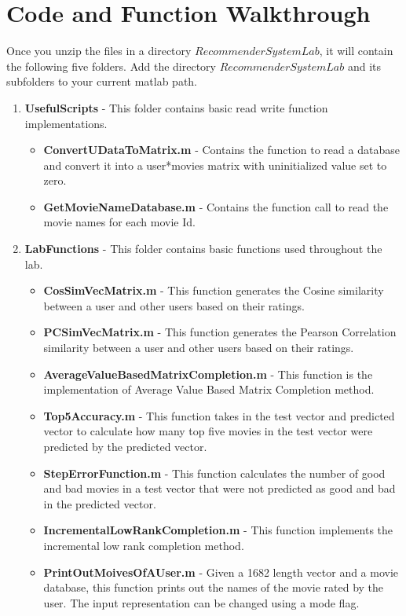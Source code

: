 \section{Code and Function Walkthrough}
Once you unzip the files in a directory $RecommenderSystemLab$, it will contain the following five folders. Add the directory $RecommenderSystemLab$ and its subfolders to your current matlab path.
\begin{enumerate}
\item \textbf{UsefulScripts} - This folder contains basic read write function implementations.
\begin{itemize}
\item \textbf{ConvertUDataToMatrix.m} - Contains the function to read a database and convert it into a user*movies matrix with uninitialized value set to zero.
\item \textbf{GetMovieNameDatabase.m} - Contains the function call to read the movie names for each movie Id.
\end{itemize}
\item \textbf{LabFunctions} - This folder contains basic functions used throughout the lab.
\begin{itemize}
\item \textbf{CosSimVecMatrix.m} - This function generates the Cosine similarity between a user and other users based on their ratings.
\item \textbf{PCSimVecMatrix.m} - This function generates the Pearson Correlation similarity between a user and other users based on their ratings.
\item \textbf{AverageValueBasedMatrixCompletion.m} - This function is the implementation of Average Value Based Matrix Completion method.
\item \textbf{Top5Accuracy.m} - This function takes in the test vector and predicted vector to calculate how many top five movies in the test vector were predicted by the predicted vector.
\item \textbf{StepErrorFunction.m} - This function calculates the number of good and bad movies in a test vector that were not predicted as good and bad in the predicted vector.
\item \textbf{IncrementalLowRankCompletion.m} - This function implements the incremental low rank completion method.
\item \textbf{PrintOutMoivesOfAUser.m} - Given a 1682 length vector and a movie database, this function prints out the names of the movie rated by the user. The input representation can be changed using a mode flag.

\end{itemize}
\end{enumerate}

